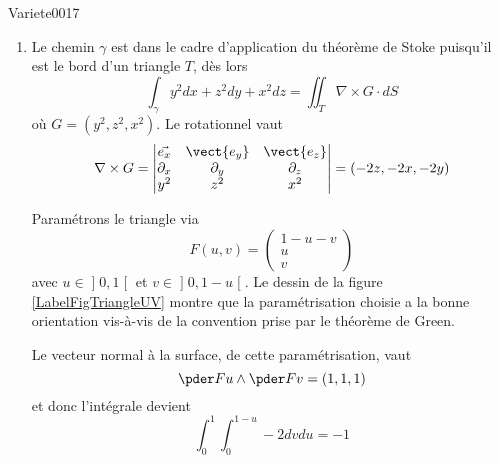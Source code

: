 
\begin{corrige}{Variete0017}


	\begin{enumerate}

		\item

			Le chemin $\gamma$ est dans le cadre d'application du théorème de Stoke puisqu'il est le bord d'un triangle $T$, dès lors
			\begin{equation*}
				\int_{\gamma} y^2 d x + z^2 d y + x^2 d z = \iint_T \nabla\times G \cdot dS
			\end{equation*}
			où $G = (y^2, z^2, x^2)$. Le rotationnel vaut
			\begin{equation*}
				\nabla\times G =
				\begin{vmatrix}
                    \vec{e_x} & \vect{e_y} & \vect{e_z}\\
					\partial_x & \partial_y & \partial_z \\
					y^2 & z^2 & x^2
				\end{vmatrix}
				= (-2 z, -2 x, - 2 y)
			\end{equation*}

			Paramétrons le triangle via
			\begin{equation}
				F(u,v)=\begin{pmatrix}
					1-u-v	\\ 
					u	\\ 
					v	
				\end{pmatrix}
			\end{equation}
			avec $u\in\mathopen] 0 , 1 \mathclose[$ et $v\in\mathopen] 0 , 1-u \mathclose[$. Le dessin de la figure \ref{LabelFigTriangleUV} montre que la paramétrisation choisie a la bonne orientation vis-à-vis de la convention prise par le théorème de Green.
			\newcommand{\CaptionFigTriangleUV}{Question d'orientation. La base $(\nu,T)$ a la même orientation que la base $(1_u,1_v)$. Cela fait que la carte choisie est de bonne orientation.}
			

			Le vecteur normal à la surface, de cette paramétrisation, vaut
			\begin{equation*}
				\pder F u \wedge \pder F v = (1,1,1)
			\end{equation*}
			et donc l'intégrale devient
			\begin{equation*}
				\int_0^1 \int_0^{1-u} -2 d v d u = -1
			\end{equation*}


\end{enumerate}
\end{corrige}
